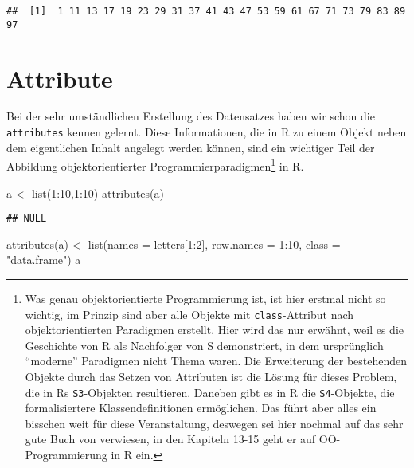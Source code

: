 \documentclass[
]{book}
\newenvironment{Shaded}{\begin{snugshade}}{\end{snugshade}}
\newcommand{\AttributeTok}[1]{\textcolor[rgb]{0.77,0.63,0.00}{#1}}
\newcommand{\DecValTok}[1]{\textcolor[rgb]{0.00,0.00,0.81}{#1}}
\newcommand{\FunctionTok}[1]{\textcolor[rgb]{0.00,0.00,0.00}{#1}}
\newcommand{\NormalTok}[1]{#1}
\newcommand{\OtherTok}[1]{\textcolor[rgb]{0.56,0.35,0.01}{#1}}
\newcommand{\SpecialCharTok}[1]{\textcolor[rgb]{0.00,0.00,0.00}{#1}}
\newcommand{\StringTok}[1]{\textcolor[rgb]{0.31,0.60,0.02}{#1}}
\begin{document}
\begin{verbatim}
##  [1]  1 11 13 17 19 23 29 31 37 41 43 47 53 59 61 67 71 73 79 83 89 97
\end{verbatim}

\hypertarget{attribute}{%
\chapter{Attribute}\label{attribute}}

Bei der sehr umständlichen Erstellung des Datensatzes haben wir schon die \texttt{attributes} kennen gelernt. Diese Informationen, die in R zu einem Objekt neben dem eigentlichen Inhalt angelegt werden können, sind ein wichtiger Teil der Abbildung objektorientierter Programmierparadigmen\footnote{Was genau objektorientierte Programmierung ist, ist hier erstmal nicht so wichtig, im Prinzip sind aber alle Objekte mit \texttt{class}-Attribut nach objektorientierten Paradigmen erstellt. Hier wird das nur erwähnt, weil es die Geschichte von R als Nachfolger von S demonstriert, in dem ursprünglich ``moderne'' Paradigmen nicht Thema waren. Die Erweiterung der bestehenden Objekte durch das Setzen von Attributen ist die Lösung für dieses Problem, die in Rs \texttt{S3}-Objekten resultieren. Daneben gibt es in R die \texttt{S4}-Objekte, die formalisiertere Klassendefinitionen ermöglichen. Das führt aber alles ein bisschen weit für diese Veranstaltung, deswegen sei hier nochmal auf das sehr gute Buch von \citet{wickhamAdvanced2019} verwiesen, in den Kapiteln 13-15 geht er auf OO-Programmierung in R ein.} in R.

\begin{Shaded}
\begin{Highlighting}[]
\NormalTok{a }\OtherTok{\textless{}{-}} \FunctionTok{list}\NormalTok{(}\DecValTok{1}\SpecialCharTok{:}\DecValTok{10}\NormalTok{,}\DecValTok{1}\SpecialCharTok{:}\DecValTok{10}\NormalTok{)}
\FunctionTok{attributes}\NormalTok{(a)}
\end{Highlighting}
\end{Shaded}

\begin{verbatim}
## NULL
\end{verbatim}

\begin{Shaded}
\begin{Highlighting}[]
\FunctionTok{attributes}\NormalTok{(a) }\OtherTok{\textless{}{-}} \FunctionTok{list}\NormalTok{(}\AttributeTok{names =}\NormalTok{ letters[}\DecValTok{1}\SpecialCharTok{:}\DecValTok{2}\NormalTok{],}
                      \AttributeTok{row.names =} \DecValTok{1}\SpecialCharTok{:}\DecValTok{10}\NormalTok{,}
                      \AttributeTok{class =} \StringTok{"data.frame"}\NormalTok{)}
\NormalTok{a}
\end{Highlighting}
\end{Shaded}
\end{document}

